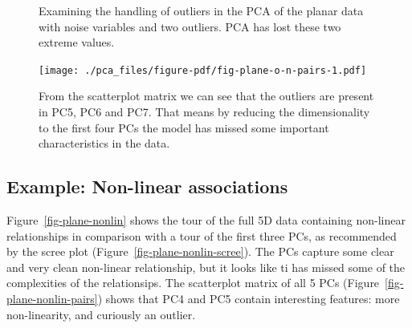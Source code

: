 \documentclass[
  letterpaper,
]{book}
\newenvironment{Shaded}{\begin{snugshade}}{\end{snugshade}}
\newcommand{\FunctionTok}[1]{\textcolor[rgb]{0.28,0.35,0.67}{#1}}
\newcommand{\NormalTok}[1]{\textcolor[rgb]{0.00,0.23,0.31}{#1}}
\newcommand{\SpecialCharTok}[1]{\textcolor[rgb]{0.37,0.37,0.37}{#1}}
\begin{document}
\begin{figure}

\begin{minipage}[t]{0.50\linewidth}

{\centering 

}

\end{minipage}%

\caption{\label{fig-p-o-pca}Examining the handling of outliers in the
PCA of the planar data with noise variables and two outliers. PCA has
lost these two extreme values.}

\end{figure}

\begin{Shaded}
\end{Shaded}

\begin{figure}[H]

{\centering \texttt{[image: ./pca\_files/figure-pdf/fig-plane-o-n-pairs-1.pdf]}

}

\caption{\label{fig-plane-o-n-pairs}From the scatterplot matrix we can
see that the outliers are present in PC5, PC6 and PC7. That means by
reducing the dimensionality to the first four PCs the model has missed
some important characteristics in the data.}

\end{figure}

\hypertarget{example-non-linear-associations}{%
\subsection{Example: Non-linear
associations}\label{example-non-linear-associations}}

Figure~\ref{fig-plane-nonlin} shows the tour of the full 5D data
containing non-linear relationships in comparison with a tour of the
first three PCs, as recommended by the scree plot
(Figure~\ref{fig-plane-nonlin-scree}). The PCs capture some clear and
very clean non-linear relationship, but it looks like ti has missed some
of the complexities of the relationsips. The scatterplot matrix of all 5
PCs (Figure~\ref{fig-plane-nonlin-pairs}) shows that PC4 and PC5 contain
interesting features: more non-linearity, and curiously an outlier.
\end{document}
